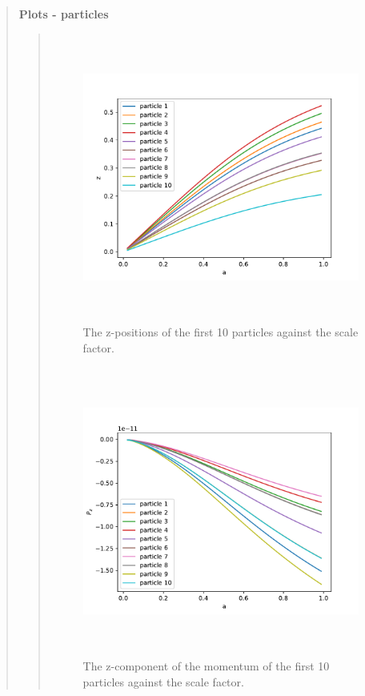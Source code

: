 \begin{quote}
\textbf{Plots - particles}
\begin{quote}
\begin{figure}[!ht]
\centering
\includegraphics[width=14cm, height=9.5cm]{./Plots/4d_pos.pdf}
\caption{The z-positions of the first 10 particles against the scale factor.}
\end{figure}
\newpage
\begin{figure}[!ht]
\centering
\includegraphics[width=14cm, height=9.5cm]{./Plots/4d_momentum.pdf}
\caption{The z-component of the momentum of the first 10 particles against the scale factor. }
\end{figure}
\end{quote}



\end{quote}





